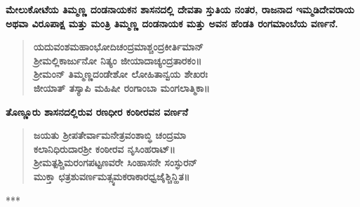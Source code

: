 \noindent
\textbf{ಮೇಲುಕೋಟೆಯ ತಿಮ್ಮಣ್ಣ ದಂಡನಾಯಕನ ಶಾಸನದಲ್ಲಿ ದೇವತಾ ಸ್ತುತಿಯ ನಂತರ, ರಾಜನಾದ ಇಮ್ಮಡಿದೇವರಾಯ ಅಥವಾ ವಿರೂಪಾಕ್ಷ ಮತ್ತು ಮಂತ್ರಿ ತಿಮ್ಮಣ್ಣ ದಂಡನಾಯಕ ಮತ್ತು ಅವನ ಹೆಂಡತಿ ರಂಗಮಾಂಬೆಯ ವರ್ಣನೆ.}

\begin{verse}
\textbf{ಯದುವಂಶಮಹಾಂಭೋದಿಚಂದ್ರಮಾಶ್ಚಂದ್ರಕೀರ್ತಿಮಾನ್​ \\ ಶ‍್ರೀಮಲ್ಲಿಕಾರ್ಜುನೋ ನಿತ್ಯಂ ಜೀಯಾದಾಚ್ಯಂದ್ರತಾರಕಂ॥}\\ \textbf{ಶ‍್ರೀಮಂನ್​ ತಿಮ್ಮಣ್ಣದಂಡೇಶೋ ಲೋಹಿತಾನ್ವಯ ಶೇಖರಃ \\ ಜೀಯಾತ್​ ತಸ್ಯಾಪಿ ಮಹಿಷೀ ರಂಗಾಂಬಾ ಮಂಗಲಾತ್ಮಿಕಾ॥}
\end{verse}

\noindent
\textbf{ತೊಣ್ಣೂರು ಶಾಸನದಲ್ಲಿರುವ ರಣಧೀರ ಕಂಠೀರವನ ವರ್ಣನೆ}

\begin{verse}
\textbf{ಜಯತು ಶ‍್ರೀಪತೇರ್ವಾಮನೇತ್ರವಂಶಾಬ್ಧಿ ಚಂದ್ರಮಾ \\ ಕಲಾನಿಧಿರುದಾರಶ‍್ರೀ ಕಂಠೀರವ ನೃಸಿಂಹರಾಟ್​॥ \\ ಶ‍್ರೀಮತ್ಪಶ್ಚಿಮರಂಗಪಟ್ಟಣವರೇ ಸಿಂಹಾಸನೇ ಸಂಸ್ಫುರನ್​ \\ ಮುಕ್ತಾ ಛತ್ರಶುವರ್ಣಮತ್ಸ್ಯಮಕರಾಕಾರಧ್ವಜೈಶ್ಚಿನ್ಹಿತ॥}
\end{verse}

\begin{center}
***
\end{center}

\theendnotes

